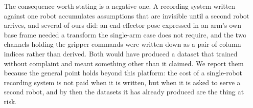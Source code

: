 The consequence worth stating is a negative one. A recording system written
against one robot accumulates assumptions that are invisible until a second
robot arrives, and several of ours did: an end-effector pose expressed in an
arm's own base frame needed a transform the single-arm case does not require, and
the two channels holding the gripper commands were written down as a pair of
column indices rather than derived. Both would have produced a dataset that
trained without complaint and meant something other than it claimed. We report
them because the general point holds beyond this platform: the cost of a
single-robot recording system is not paid when it is written, but when it is
asked to serve a second robot, and by then the datasets it has already produced
are the thing at risk.
